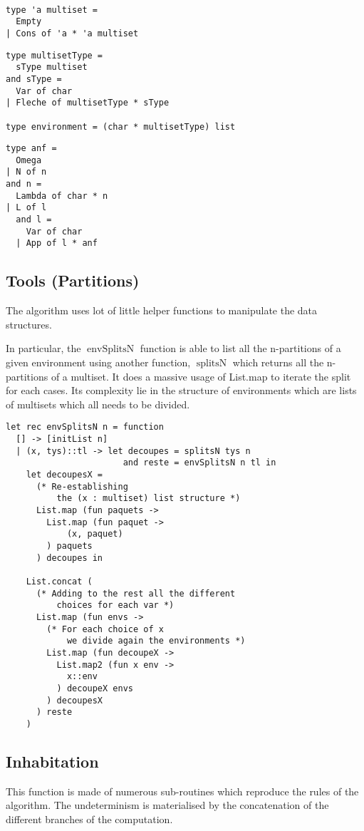\documentclass{article}
\DeclareMathOperator{\ienvSPlit}{envSplitsN}
\DeclareMathOperator{\isplit}{splitsN}
\begin{document}
\
\begin{lstlisting}[caption={Multisets}]
type 'a multiset =
  Empty
| Cons of 'a * 'a multiset
\end{lstlisting}

\begin{lstlisting}[caption={Intersection types and environments}]
type multisetType = 
  sType multiset
and sType = 
  Var of char
| Fleche of multisetType * sType

type environment = (char * multisetType) list
\end{lstlisting}

\begin{lstlisting}[caption={Approximate normal forms}]
type anf = 
  Omega
| N of n
and n = 
  Lambda of char * n
| L of l
  and l =
    Var of char
  | App of l * anf
\end{lstlisting}


\subsection{Tools (Partitions)}
The algorithm uses lot of little helper functions to manipulate the data structures.

In particular, the $\ienvSPlit$ function is able to list all the n-partitions of a given environment using another function, $\isplit$ which returns all the n-partitions of a multiset. It does a massive usage of List.map to iterate the split for each cases. Its complexity lie in the structure of environments which are lists of multisets which all needs to be divided.

\begin{lstlisting}[caption={Partitions of an environment}]
let rec envSplitsN n = function
  [] -> [initList n]
  | (x, tys)::tl -> let decoupes = splitsN tys n 
                       and reste = envSplitsN n tl in
    let decoupesX = 
      (* Re-establishing 
          the (x : multiset) list structure *)
      List.map (fun paquets -> 
        List.map (fun paquet -> 
            (x, paquet)
        ) paquets
      ) decoupes in
            
    List.concat (
      (* Adding to the rest all the different
          choices for each var *)
      List.map (fun envs -> 
        (* For each choice of x 
            we divide again the environments *)
        List.map (fun decoupeX -> 
          List.map2 (fun x env -> 
            x::env
          ) decoupeX envs
        ) decoupesX
      ) reste
    )
\end{lstlisting}

\subsection{Inhabitation}
This function is made of numerous sub-routines which reproduce the rules of the algorithm. The undeterminism is materialised by the concatenation of the different branches of the computation.



\end{document}
